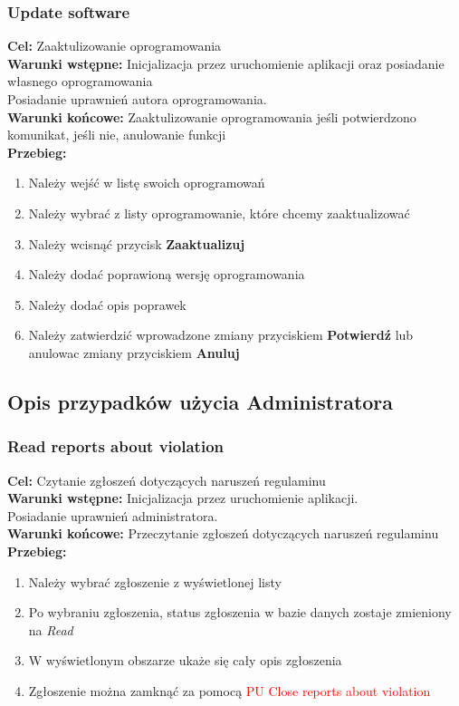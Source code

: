 \documentclass[12pt,a4paper]{article}
\begin{document}
\subsubsection{Update software}
\textbf{Cel: } Zaaktulizowanie oprogramowania \\
\textbf{Warunki wstępne:} Inicjalizacja przez uruchomienie aplikacji oraz posiadanie własnego oprogramowania\\ Posiadanie uprawnień autora oprogramowania.\\
\textbf{Warunki końcowe:} Zaaktulizowanie oprogramowania jeśli potwierdzono komunikat, jeśli nie, anulowanie funkcji\\
\textbf{Przebieg:}
\begin{enumerate}
    \item Należy wejść w listę swoich oprogramowań
    \item Należy wybrać z listy oprogramowanie, które chcemy zaaktualizować
    \item Należy wcisnąć przycisk \textbf{Zaaktualizuj}\
    \item Należy dodać poprawioną wersję oprogramowania
    \item Należy dodać opis poprawek
    \item Należy zatwierdzić wprowadzone zmiany przyciskiem \textbf{Potwierdź} lub anulowac zmiany przyciskiem \textbf{Anuluj}
\end{enumerate}


\subsection{Opis przypadków użycia Administratora}


\subsubsection{Read reports about violation}
\textbf{Cel: } Czytanie zgłoszeń dotyczących naruszeń regulaminu\\
\textbf{Warunki wstępne:} Inicjalizacja przez uruchomienie aplikacji.\\ Posiadanie uprawnień administratora.\\
\textbf{Warunki końcowe:} Przeczytanie zgłoszeń dotyczących naruszeń regulaminu\\
\textbf{Przebieg:}
\begin{enumerate}
    \item Należy wybrać zgłoszenie z wyświetlonej listy
    \item Po wybraniu zgłoszenia, status zgłoszenia w bazie danych zostaje zmieniony na \textit{Read} 
    \item W wyświetlonym obszarze ukaże się cały opis zgłoszenia
    \item Zgłoszenie można zamknąć za pomocą \textcolor{red}{PU Close reports about violation}
\end{enumerate}
\end{document}
